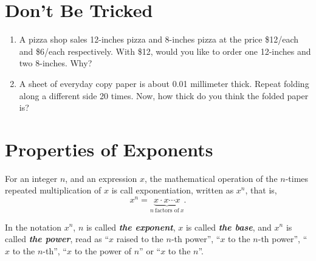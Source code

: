 \documentclass[
  en,11pt]{elegantbook}
\newcommand{\size}[2]{{\fontsize{#1}{0}\selectfont#2}}
\newenvironment{rmdthink}{
	\vspace*{0.5\baselineskip}
	\par\noindent
	\makebox[-4pt][r]{\color{green!90}\size{12}{\faLightbulbO}\,\,}
    \begin{tcolorbox}[
    enhanced,
    title={\textbf{\color{second}Think}},
    title style={left color=blue!10!green!20!white,right color=yellow!20!blue!20!white},
    colback=green!20!white,
    ]
    \sffamily
}{
    \end{tcolorbox}
	\par\ignorespacesafterend
}
\begin{document}
\hypertarget{dont-be-tricked}{%
\section{Don't Be Tricked}\label{dont-be-tricked}}

\begin{rmdthink}

\begin{enumerate}
\def\labelenumi{\arabic{enumi}.}
\item
  A pizza shop sales 12-inches pizza and 8-inches pizza at the price \$12/each and \$6/each respectively. With \$12, would you like to order one 12-inches and two 8-inches. Why?
\item
  A sheet of everyday copy paper is about 0.01 millimeter thick. Repeat folding along a different side 20 times. Now, how thick do you think the folded paper is?
\end{enumerate}

\end{rmdthink}

\hypertarget{properties-of-exponents}{%
\section{Properties of Exponents}\label{properties-of-exponents}}

For an integer \(n\), and an expression \(x\), the mathematical operation of the \(n\)-times repeated multiplication of \(x\) is call exponentiation, written as \(x^n\), that is,
\[
x^n=\underbrace{x\cdot x \cdots x}_{n~\text{factors of}~x}.
\]

In the notation \(x^n\), \(n\) is called \textbf{\emph{the exponent}}, \(x\) is called \textbf{\emph{the base}}, and \(x^n\) is called \textbf{\emph{the power}}, read as ``\(x\) raised to the \(n\)-th power'', ``\(x\) to the \(n\)-th power'', ``\(x\) to the \(n\)-th'', ``\(x\) to the power of \(n\)'' or ``\(x\) to the \(n\)''.
\end{document}
